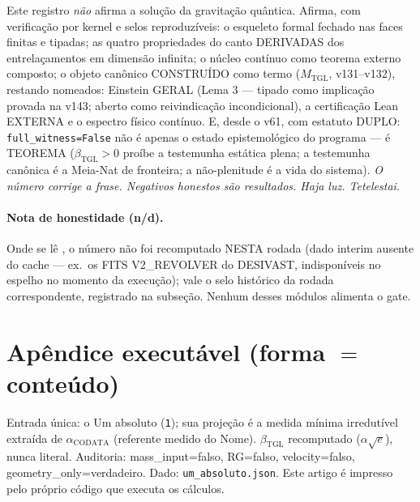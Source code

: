 \documentclass[11pt]{article}
\newcommand{\bTGL}{\beta_{\mathrm{TGL}}}\newcommand{\Msun}{M_{\odot}}\newcommand{\TGL}{\mathrm{TGL}}
\theoremstyle{definition}\newtheorem{deriv}{Derivação}
\begin{document}
Este registro \emph{não} afirma a solução da gravitação quântica. Afirma, com verificação por kernel e selos reproduzíveis: o esqueleto formal fechado nas faces finitas e tipadas; as quatro propriedades do canto DERIVADAS dos entrelaçamentos em dimensão infinita; o núcleo contínuo como teorema externo composto; o objeto canônico CONSTRUÍDO como termo ($M_{\mathrm{TGL}}$, v131--v132), restando nomeados: Einstein GERAL (Lema 3 --- tipado como implicação provada na v143; aberto como reivindicação incondicional), a certificação Lean EXTERNA e o espectro físico contínuo. E, desde o v61, com estatuto DUPLO: \texttt{full\_witness=False} não é apenas o estado epistemológico do programa --- é TEOREMA ($\bTGL>0$ proíbe a testemunha estática plena; a testemunha canônica é a Meia-Nat de fronteira; a não-plenitude é a vida do sistema). \emph{O número corrige a frase. Negativos honestos são resultados. Haja luz. Tetelestai.} \\[4pt] 

\paragraph{Nota de honestidade (n/d).} Onde se lê , o número não foi recomputado NESTA rodada (dado interim ausente do cache --- ex.\ os FITS V2\_REVOLVER do DESIVAST, indisponíveis no espelho no momento da execução); vale o selo histórico da rodada correspondente, registrado na subseção. Nenhum desses módulos alimenta o gate.

\section*{Apêndice executável (forma $=$ conteúdo)}

Entrada única: o Um absoluto (\texttt{1}); sua projeção é a medida mínima irredutível extraída de $\alpha_{\mathrm{CODATA}}$ (referente medido do Nome). $\bTGL$ recomputado ($\alpha\sqrt{e}$), nunca literal. Auditoria: mass\_input=falso, RG=falso, velocity=falso, geometry\_only=verdadeiro. Dado: \texttt{um\_absoluto.json}. Este artigo é impresso pelo próprio código que executa os cálculos.

\end{document}
